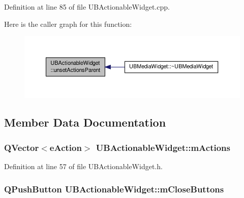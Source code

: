 Definition at line 85 of file U\-B\-Actionable\-Widget.\-cpp.



Here is the caller graph for this function\-:
\nopagebreak
\begin{figure}[H]
\begin{center}
\leavevmode
\includegraphics[width=350pt]{da/d07/class_u_b_actionable_widget_a702d3b49cd297cad86d84ec7fa618283_icgraph}
\end{center}
\end{figure}




\subsection{Member Data Documentation}
\hypertarget{class_u_b_actionable_widget_a007e456e980693b9d6986a7839a88e9d}{
\subsubsection[{m\-Actions}]{\setlength{\rightskip}{0pt plus 5cm}Q\-Vector$<${\bf e\-Action}$>$ U\-B\-Actionable\-Widget\-::m\-Actions\hspace{0.3cm}{\ttfamily [protected]}}}\label{da/d07/class_u_b_actionable_widget_a007e456e980693b9d6986a7839a88e9d}


Definition at line 57 of file U\-B\-Actionable\-Widget.\-h.

\hypertarget{class_u_b_actionable_widget_a38e1cace7d01e5d41830e1c62118d7c3}{
\subsubsection[{m\-Close\-Buttons}]{\setlength{\rightskip}{0pt plus 5cm}Q\-Push\-Button U\-B\-Actionable\-Widget\-::m\-Close\-Buttons\hspace{0.3cm}{\ttfamily [protected]}}}\label{da/d07/class_u_b_actionable_widget_a38e1cace7d01e5d41830e1c62118d7c3}



